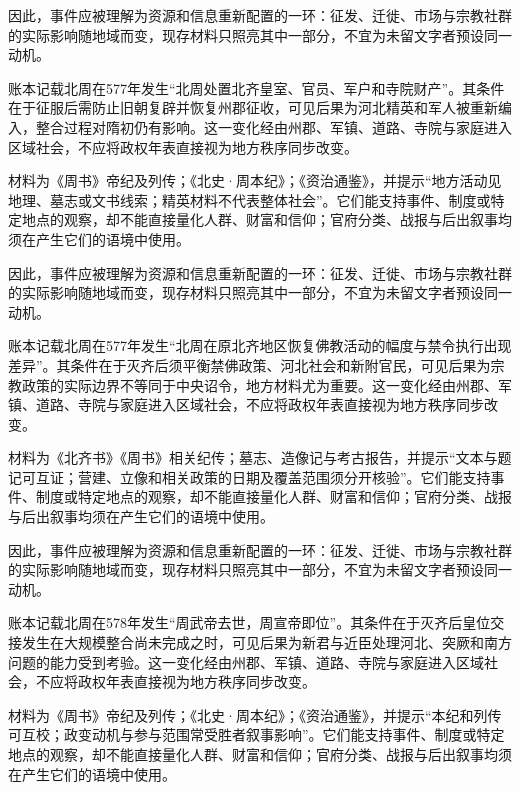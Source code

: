 因此，事件应被理解为资源和信息重新配置的一环：征发、迁徙、市场与宗教社群的实际影响随地域而变，现存材料只照亮其中一部分，不宜为未留文字者预设同一动机。

账本记载北周在577年发生“北周处置北齐皇室、官员、军户和寺院财产”。其条件在于征服后需防止旧朝复辟并恢复州郡征收，可见后果为河北精英和军人被重新编入，整合过程对隋初仍有影响。这一变化经由州郡、军镇、道路、寺院与家庭进入区域社会，不应将政权年表直接视为地方秩序同步改变。

材料为《周书》帝纪及列传；《北史·周本纪》；《资治通鉴》，并提示“地方活动见地理、墓志或文书线索；精英材料不代表整体社会”。它们能支持事件、制度或特定地点的观察，却不能直接量化人群、财富和信仰；官府分类、战报与后出叙事均须在产生它们的语境中使用。

因此，事件应被理解为资源和信息重新配置的一环：征发、迁徙、市场与宗教社群的实际影响随地域而变，现存材料只照亮其中一部分，不宜为未留文字者预设同一动机。

账本记载北周在577年发生“北周在原北齐地区恢复佛教活动的幅度与禁令执行出现差异”。其条件在于灭齐后须平衡禁佛政策、河北社会和新附官民，可见后果为宗教政策的实际边界不等同于中央诏令，地方材料尤为重要。这一变化经由州郡、军镇、道路、寺院与家庭进入区域社会，不应将政权年表直接视为地方秩序同步改变。

材料为《北齐书》《周书》相关纪传；墓志、造像记与考古报告，并提示“文本与题记可互证；营建、立像和相关政策的日期及覆盖范围须分开核验”。它们能支持事件、制度或特定地点的观察，却不能直接量化人群、财富和信仰；官府分类、战报与后出叙事均须在产生它们的语境中使用。

因此，事件应被理解为资源和信息重新配置的一环：征发、迁徙、市场与宗教社群的实际影响随地域而变，现存材料只照亮其中一部分，不宜为未留文字者预设同一动机。

账本记载北周在578年发生“周武帝去世，周宣帝即位”。其条件在于灭齐后皇位交接发生在大规模整合尚未完成之时，可见后果为新君与近臣处理河北、突厥和南方问题的能力受到考验。这一变化经由州郡、军镇、道路、寺院与家庭进入区域社会，不应将政权年表直接视为地方秩序同步改变。

材料为《周书》帝纪及列传；《北史·周本纪》；《资治通鉴》，并提示“本纪和列传可互校；政变动机与参与范围常受胜者叙事影响”。它们能支持事件、制度或特定地点的观察，却不能直接量化人群、财富和信仰；官府分类、战报与后出叙事均须在产生它们的语境中使用。

